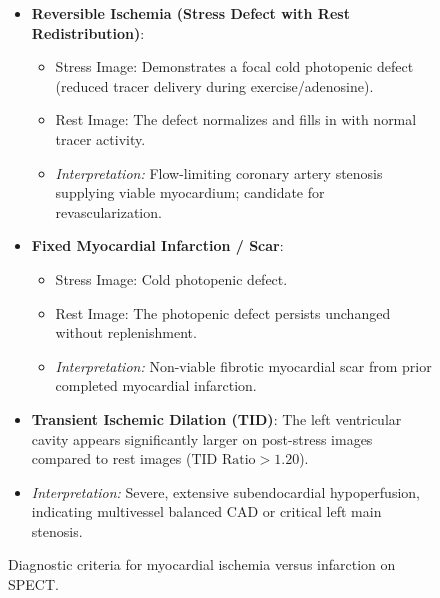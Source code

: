 \documentclass[11pt,a4paper]{article}
\begin{document}
\begin{figure}[htbp]
\centering
\begin{tcolorbox}[colback=teal!5!white,colframe=teal!75!black,arc=1mm,title=\sffamily Diagnostic Signatures in Myocardial Perfusion SPECT]
\small
\begin{itemize}
    \item \textbf{Reversible Ischemia (Stress Defect with Rest Redistribution)}:
    \begin{itemize}
        \item Stress Image: Demonstrates a focal cold photopenic defect (reduced tracer delivery during exercise/adenosine).
        \item Rest Image: The defect normalizes and fills in with normal tracer activity.
        \item \emph{Interpretation:} Flow-limiting coronary artery stenosis supplying viable myocardium; candidate for revascularization.
    \end{itemize}
    \item \textbf{Fixed Myocardial Infarction / Scar}:
    \begin{itemize}
        \item Stress Image: Cold photopenic defect.
        \item Rest Image: The photopenic defect persists unchanged without replenishment.
        \item \emph{Interpretation:} Non-viable fibrotic myocardial scar from prior completed myocardial infarction.
    \end{itemize}
    \item \textbf{Transient Ischemic Dilation (TID)}: The left ventricular cavity appears significantly larger on post-stress images compared to rest images ($\text{TID Ratio} > 1.20$).
    \item \emph{Interpretation:} Severe, extensive subendocardial hypoperfusion, indicating multivessel balanced CAD or critical left main stenosis.
\end{itemize}
\end{tcolorbox}
\caption{Diagnostic criteria for myocardial ischemia versus infarction on SPECT.}
\label{fig:bullseye}
\end{figure}
\end{document}
